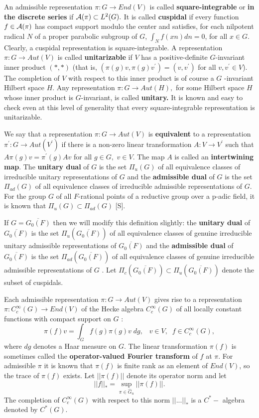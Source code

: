 An admissible representation $\pi :G\rightarrow End(V)$ is called {\bf %
square-integrable} or {\bf in the discrete series} if ${\cal A}(\pi )\subset
L^2(G).$ It is called {\bf cuspidal} if every function $f\in {\cal A}(\pi )$
has compact support modulo the center and satisfies, for each nilpotent
radical $N$ of a proper parabolic subgroup of $G$, $\int_Nf(xn)dn=0$, for
all $x\in G$. Clearly, a cuspidal representation is square-integrable. A
representation $\pi :G\rightarrow Aut(V)$ is called {\bf unitarizable} if $V$
has a positive-definite $G$-invariant inner product $(*,*)$ (that is, $(\pi
(g)v,\pi (g)v^{\prime })=(v,v^{\prime })$ for all $v,v^{\prime }\in V$). The
completion of $V$ with respect to this inner product is of course a $G$%
-invariant Hilbert space $H$. Any representation $\pi :G\rightarrow Aut(H),$
for some Hilbert space $H$ whose inner product is $G$-invariant, is called 
{\bf unitary. }It is known and easy to check even at this level of
generality that every square-integrable representation is unitarizable.

We say that a representation $\pi :G\rightarrow Aut(V)$ is {\bf equivalent}
to a representation $\pi ^{\prime }:G\rightarrow Aut(V^{\prime })$ if there
is a non-zero linear transformation $A:V\rightarrow V^{\prime }$ such that $%
A\pi (g)v=\pi ^{\prime }(g)Av$ for all $g\in G,$ $v\in V.$ The map $A$ is
called an {\bf intertwining map}. The {\bf unitary dual} of $G$ is the set $%
\Pi _u(G)$ of all equivalence classes of irreducible unitary representations
of $G$ and the {\bf admissible dual} of $G$ is the set $\Pi _{ad}(G)$ of all
equivalence classes of irreducible admissible representations of $G.$ For
the group $G$ of all $F$-rational points of a reductive group over a p-adic
field, it is known that $\Pi _u(G)\subset \Pi _{ad}(G)$ [S].

If $G=\overline{G_0(F)}$ then we will modify this definition slightly: the 
{\bf unitary dual} of $\overline{G_0(F)}$ is the set $\Pi _u(\overline{G_0(F)%
})$ of all equivalence classes of genuine irreducible unitary admissible
representations of $\overline{G_0(F)}$ and the {\bf admissible dual} of $%
\overline{G_0(F)}$ is the set $\Pi _{ad}(\overline{G_0(F)})$ of all
equivalence classes of genuine irreducible admissible representations of $G$%
. Let $\Pi _c(\overline{G_0(F)})\subset \Pi _u(\overline{G_0(F)})$ denote
the subset of cuspidals.

Each admissible representation $\pi :G\rightarrow Aut(V)$ gives rise to a
representation $\pi :C_c^\infty (G)\rightarrow End(V)$ of the Hecke algebra $%
C_c^\infty (G)$ of all locally constant functions with compact support on $G$%
: 
\[
\pi (f)v=\int_Gf(g)\pi (g)v\;dg,\;\;\;v\in V,\;\;f\in C_c^\infty (G), 
\]
where $dg$ denotes a Haar measure on $G$. The linear transformation $\pi (f)$
is sometimes called the {\bf operator-valued Fourier transform} of $f$ at $%
\pi .$ For admissible $\pi $ it is known that $\pi (f)$ is finite rank as an
element of $End(V)$, so the trace of $\pi (f)$ exists. Let $||\pi (f)||$
denote its operator norm and let 
\[
||f||_{*}=\sup_{\pi \in \hat G_u}||\pi (f)||. 
\]
The completion of $C_c^\infty (G)$ with respect to this norm $||...||_{*}$
is a $C^{*}-$ algebra denoted by $C^{*}(G)$.

